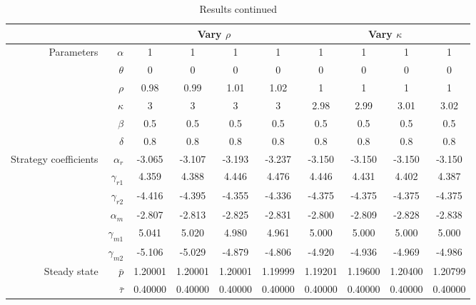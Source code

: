 \begin{sidewaystable}[htbp]
  \centering
  \caption{Results continued}
    \begin{tabular}{|rr|cccc|cccc|}
    \hline
          &       & \multicolumn{4}{c|}{Vary $\rho$}        & \multicolumn{4}{c|}{Vary $\kappa$}  \\
    \hline
    \multirow{6}[1]{*}{Parameters} & $\alpha$ & 1     & 1     & 1     & 1     & 1     & 1     & 1     & 1\\
          & $\theta$ & 0     & 0     & 0     & 0     & 0     & 0     & 0     & 0 \\
          & $\rho$ & 0.98  & 0.99  & 1.01  & 1.02  & 1     & 1     & 1     & 1 \\
          & $\kappa$ & 3     & 3     & 3     & 3     & 2.98  & 2.99  & 3.01  & 3.02 \\
          & $\beta$ & 0.5   & 0.5   & 0.5   & 0.5   & 0.5   & 0.5   & 0.5   & 0.5 \\
          & $\delta$ & 0.8   & 0.8   & 0.8   & 0.8   & 0.8   & 0.8   & 0.8   & 0.8 \\ \hline
    \multirow{6}[0]{*}{Strategy coefficients} & $\alpha_r$ & -3.065 & -3.107 & -3.193 & -3.237 & -3.150 & -3.150 & -3.150 & -3.150 \\
          & $\gamma_{r1}$ & 4.359 & 4.388 & 4.446 & 4.476 & 4.446 & 4.431 & 4.402 & 4.387 \\
          & $\gamma_{r2}$ & -4.416 & -4.395 & -4.355 & -4.336 & -4.375 & -4.375 & -4.375 & -4.375 \\
          & $\alpha_m$ & -2.807 & -2.813 & -2.825 & -2.831 & -2.800 & -2.809 & -2.828 & -2.838 \\
          & $\gamma_{m1}$ & 5.041 & 5.020 & 4.980 & 4.961 & 5.000 & 5.000 & 5.000 & 5.000 \\
          & $\gamma_{m2}$ & -5.106 & -5.029 & -4.879 & -4.806 & -4.920 & -4.936 & -4.969 & -4.986 \\ \hline
    \multirow{2}[1]{*}{Steady state} & $\bar{p}$ & 1.20001 & 1.20001 & 1.20001 & 1.19999 & 1.19201 & 1.19600 & 1.20400 & 1.20799 \\
          & $\bar{\tau}$ & 0.40000 & 0.40000 & 0.40000 & 0.40000 & 0.40000 & 0.40000 & 0.40000 & 0.40000 \\
    \hline
    \end{tabular}
\label{tab:numres3}
\end{sidewaystable}





